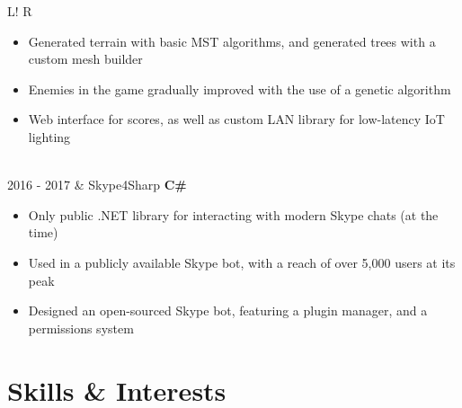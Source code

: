 \documentclass[10pt, a4paper]{article}
\newcommand\vsep{\color{lightgray} \vrule width 0.5pt}
\newcommand\sect[1]{\section*{\Large\sc #1}}
\newcommand\itemizespace{\vspace{-0.8\baselineskip}}
\begin{document}
\begin{tabular}{L!{\vsep}R}
                \begin{itemize}[label=\raisebox{0.25ex}{\tiny$\bullet$}]
                    \setlength{\itemindent}{-0.1in}
                    \item Generated terrain with basic MST algorithms, and generated trees with a custom mesh builder
                    \item Enemies in the game gradually improved with the use of a genetic algorithm
                    \item Web interface for scores, as well as custom LAN library for low-latency IoT lighting
                    \itemizespace
                \end{itemize} \\
                2016 - 2017 & Skype4Sharp \hfill \textbf{C\#}
                \begin{itemize}[label=\raisebox{0.25ex}{\tiny$\bullet$}]
                    \setlength{\itemindent}{-0.1in}
                    \item Only public .NET library for interacting with modern Skype chats (at the time)
                    \item Used in a publicly available Skype bot, with a reach of over 5,000 users at its peak
                    \item Designed an open-sourced Skype bot, featuring a plugin manager, and a permissions system
                    \vspace{-\baselineskip}
                \end{itemize}
            \end{tabular}
        \sect{Skills \& Interests}
\end{document}
